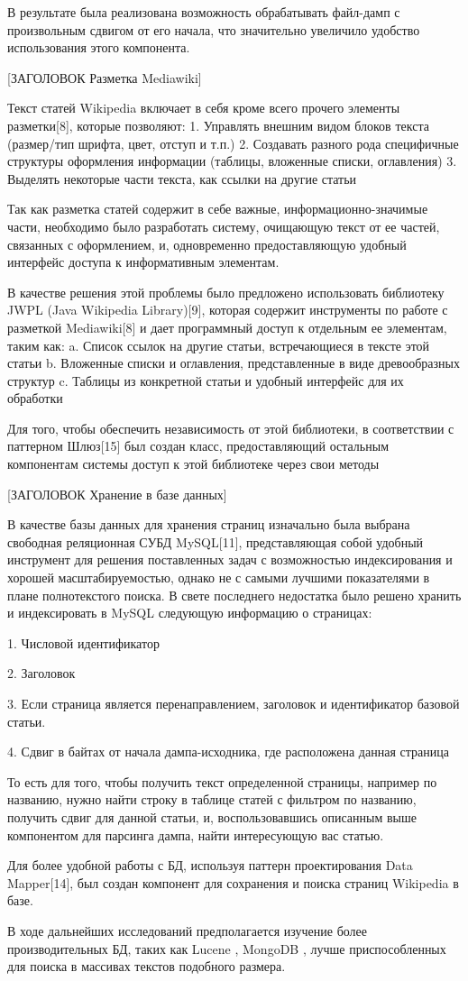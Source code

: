В результате была реализована возможность обрабатывать файл-дамп с произвольным
сдвигом от его начала, что значительно увеличило удобство использования этого компонента.  

[ЗАГОЛОВОК Разметка Mediawiki]

Текст статей Wikipedia включает в себя кроме всего прочего элементы разметки[8], которые позволяют:
1. Управлять внешним видом блоков текста (размер/тип шрифта, цвет, отступ и т.п.)
2. Создавать разного рода специфичные структуры оформления информации (таблицы, вложенные списки, оглавления)
3. Выделять некоторые части текста, как ссылки на другие статьи

Так как разметка статей содержит в себе важные, информационно-значимые части, 
необходимо было разработать систему, очищающую текст от ее частей, связанных с оформлением,
и, одновременно предоставляющую удобный интерфейс доступа к информативным элементам.

В качестве решения этой проблемы было предложено использовать библиотеку 
JWPL (Java Wikipedia Library)[9], которая содержит инструменты по работе с разметкой 
Mediawiki[8] и дает программный доступ к отдельным ее элементам, таким как:
a. Список ссылок на другие статьи, встречающиеся в тексте этой статьи
b. Вложенные списки и оглавления, представленные в виде древообразных структур
c. Таблицы из конкретной статьи и удобный интерфейс для их обработки

Для того, чтобы обеспечить независимость от этой библиотеки, в соответствии
с паттерном Шлюз[15] был создан класс, предоставляющий остальным компонентам системы
доступ к этой библиотеке через свои методы

[ЗАГОЛОВОК Хранение в базе данных]

В качестве базы данных для хранения страниц изначально была выбрана свободная реляционная 
СУБД MySQL[11], представляющая собой удобный инструмент для решения поставленных 
задач с возможностью индексирования и хорошей масштабируемостью, однако не с самыми
лучшими показателями в плане полнотекстого поиска. В свете последнего недостатка было 
решено хранить и индексировать в MySQL следующую информацию о страницах:

1. Числовой идентификатор

2. Заголовок

3. Если страница является перенаправлением, заголовок и идентификатор  базовой статьи.

4. Сдвиг в байтах от начала дампа-исходника, где расположена данная страница

То есть для того, чтобы получить текст определенной страницы, например по названию,
нужно найти строку в таблице статей с фильтром по названию,
получить сдвиг для данной статьи, и, воспользовавшись
описанным выше компонентом для парсинга дампа, найти интересующую вас статью.

Для более удобной работы с БД, используя паттерн проектирования Data Mapper[14], 
был создан компонент для сохранения и поиска страниц Wikipedia в базе.

В ходе дальнейших исследований предполагается изучение более производительных БД, таких
как Lucene \cite{lucene}, MongoDB \cite{mongoDB}, лучше приспособленных для поиска в
массивах текстов подобного размера.

